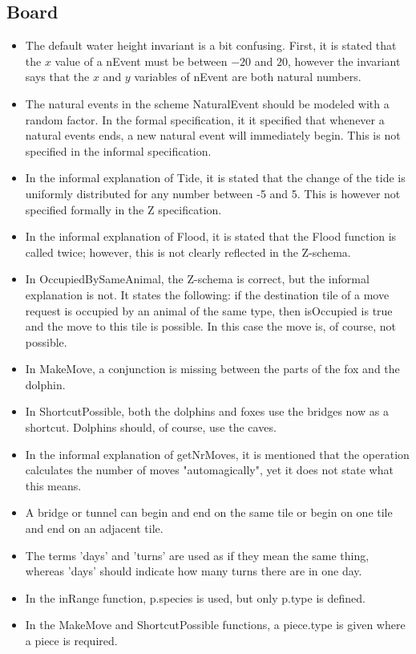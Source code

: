 \documentclass[a4paper,11pt]{article}
\begin{document}
    \subsection{Board}
    \begin{itemize}
        \item The default water height invariant is a bit confusing. First, it is stated that the $x$ value of a nEvent must be between $-20$ and $20$, however the invariant says that the $x$ and $y$ variables of nEvent are both natural numbers.
        \item The natural events in the scheme NaturalEvent should be modeled with a random factor. In the formal specification, it it specified that whenever a natural events ends, a new natural event will immediately begin. This is not specified in the informal specification.
        \item In the informal explanation of Tide, it is stated that the change of the tide is uniformly distributed for any number between -5 and 5. This is however not specified formally in the Z specification.
        \item In the informal explanation of Flood, it is stated that the Flood function is called twice; however, this is not clearly reflected in the Z-schema.
        \item In OccupiedBySameAnimal, the Z-schema is correct, but the informal explanation is not. It states the following: if the destination tile of a move request is occupied by an animal of the same type, then isOccupied is true and the move to this tile is possible. In this case the move is, of course, not possible.
        \item In MakeMove, a conjunction is missing between the parts of the fox and the dolphin.
        \item In ShortcutPossible, both the dolphins and foxes use the bridges now as a shortcut. Dolphins should, of course, use the caves.
        \item In the informal explanation of getNrMoves, it is mentioned that the operation calculates the number of moves "automagically", yet it does not state what this means.
        \item A bridge or tunnel can begin and end on the same tile or begin on one tile and end on an adjacent tile.
        \item The terms 'days' and 'turns' are used as if they mean the same thing, whereas 'days' should indicate how many turns there are in one day.
        \item In the inRange function, p.species is used, but only p.type is defined.
        \item In the MakeMove and ShortcutPossible functions, a piece.type is given where a piece is required.
    \end{itemize}
\end{document}
